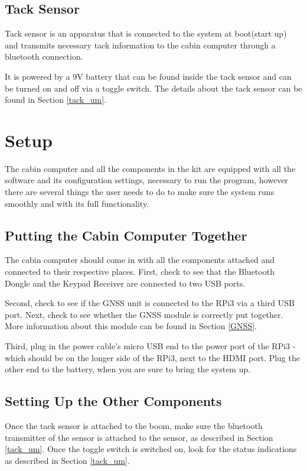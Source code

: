 \documentclass[11pt]{article}
\begin{document}
\subsection{Tack Sensor}

Tack sensor is an apparatus that is connected to the system at boot(start up) and transmits necessary tack information to the cabin computer through a bluetooth connection.

It is powered by a 9V battery that can be found inside the tack sensor and can be turned on and off via a toggle switch. The details about the tack sensor can be found in Section \ref{tack_um}.

\pagebreak

\section{Setup} \label{setup}

The cabin computer and all the components in the kit are equipped with all the software and its configuration settings, necessary to run the program, however there are several things the user needs to do to make sure the system runs smoothly and with its full functionality.

\subsection{Putting the Cabin Computer Together}

The cabin computer should come in with all the components attached and connected to their respective places. First, check to see that the Bluetooth Dongle and the Keypad Receiver are connected to two USB ports.

Second, check to see if the GNSS unit is connected to the RPi3 via a third USB port. Next, check to see whether the GNSS module is correctly put together. More information about this module can be found in Section \ref{GNSS}.

Third, plug in the power cable's micro USB end to the power port of the RPi3 - which should be on the longer side of the RPi3, next to the HDMI port. Plug the other end to the battery, when you are sure to bring the system up.

\subsection{Setting Up the Other Components}

Once the tack sensor is attached to the boom, make sure the bluetooth transmitter of the sensor is attached to the sensor, as described in Section \ref{tack_um}. Once the toggle switch is switched on, look for the status indications as described in Section \ref{tack_um}.
\end{document}
